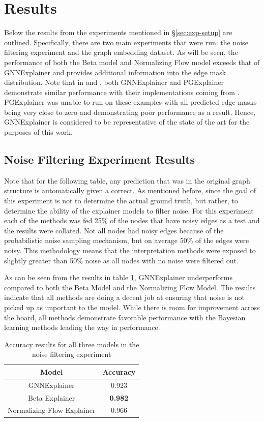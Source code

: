 \section{Results}
Below the results from the experiments mentioned in \S\ref{sec:exp-setup} are outlined. Specifically, there are two main experiments that were run: the noise filtering experiment and the graph embedding dataset. As will be seen, the performance of both the Beta model and Normalizing Flow model exceeds that of GNNExplainer and provides additional information into the edge mask distribution. Note that in \cite{yuan_explainability_2021} and \cite{lin_generative_2021}, both GNNExplainer and PGExplainer demonstrate similar performance with their implementations coming from \cite{fey_fast_2019}. PGExplainer was unable to run on these examples with all predicted edge masks being very close to zero and demonstrating poor performance as a result. Hence, GNNExplainer is considered to be representative of the state of the art for the purposes of this work.

\subsection{Noise Filtering Experiment Results}
Note that for the following table, any prediction that was in the original graph structure is automatically given a correct. As mentioned before, since the goal of this experiment is not to determine the actual ground truth, but rather, to determine the ability of the explainer models to filter noise. For this experiment each of the methods was fed 25\% of the nodes that have noisy edges as a test and the results were collated. Not all nodes had noisy edges because of the probabilistic noise sampling mechanism, but on average 50\% of the edges were noisy. This methodology means that the interpretation methods were exposed to slightly greater than 50\% noise as all nodes with no noise were filtered out.

As can be seen from the results in table \ref{tab:noise-filter-res}, GNNExplainer underperforms compared to both the Beta Model and the Normalizing Flow Model. The results indicate that all methods are doing a decent job at ensuring that noise is not picked up as important to the model. While there is room for improvement across the board, all methods demonstrate favorable performance with the Bayesian learning methods leading the way in performance.
\begin{table}[htb] 
	\centering
	\begin{tabular}{|c||c|} \hline
	Model & Accuracy\\ \hline \hline
	GNNExplainer & 0.923\\ 
	Beta Explainer & \textbf{0.982}\\ 
	Normalizing Flow Explainer & 0.966\\ \hline
	\end{tabular}
	\caption{Accuracy results for all three models in the noise filtering experiment}
	\label{tab:noise-filter-res}
\end{table}

